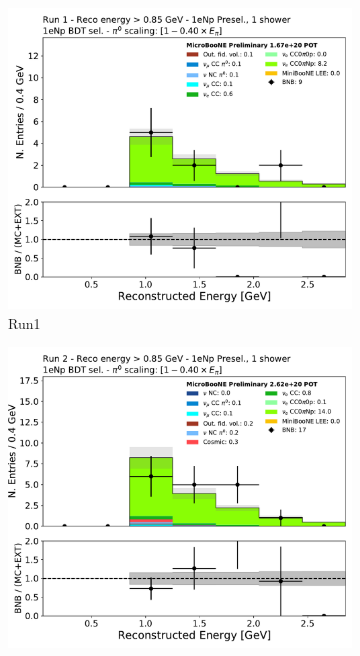 \begin{figure}[H]
    \begin{center}
    \begin{subfigure}{0.4\textwidth}
    \includegraphics[width=1.00\textwidth]{Sidebands/Figures/1eNp/TimeDependence/reco_e_coarse_HE_NPBDT_Run1.pdf}
    \caption{Run1}
    \end{subfigure}
    \begin{subfigure}{0.4\textwidth}
    \includegraphics[width=1.00\textwidth]{Sidebands/Figures/1eNp/TimeDependence/reco_e_coarse_HE_NPBDT_Run2.pdf}

\end{subfigure}
\end{center}
\end{figure}
